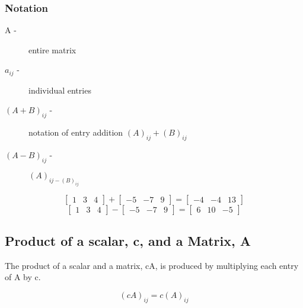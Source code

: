 \subsubsection{Notation}%
\label{ssub:notation}

\begin{description}
	\item[A -] entire matrix
		\item[$a_{ij}$ -] individual entries
		\item[$(A+B)_{ij}$ -] notation of entry addition $(A)_{ij} + (B)_{ij}$
		\item[$(A-B)_{ij}$ -] $(A)_{ij - (B)_{ij}}$
\end{description}


\begin{example}
	\[\begin{bmatrix}  1&3&4 \end{bmatrix} + \begin{bmatrix} -5&-7&9 \end{bmatrix} = \begin{bmatrix} -4&-4&13 \end{bmatrix} \]
	\[\begin{bmatrix}  1&3&4 \end{bmatrix} - \begin{bmatrix} -5&-7&9 \end{bmatrix} = \begin{bmatrix} 6&10&-5 \end{bmatrix} \]
\end{example}


\subsection{Product of a scalar, c, and a Matrix, A}%
\label{sub:product_of_a_scalar_c_and_a_matrix_a}

The product of a scalar and a matrix, cA, is produced by multiplying each entry of A by c.

\[(cA)_{ij} = c(A)_{ij}\]

